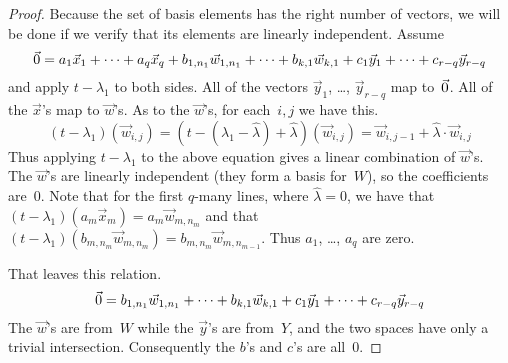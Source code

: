\begin{proof}
Because the set of basis elements 
has the right number of vectors, we will be done if we verify that
its elements are linearly independent.
Assume
\begin{equation*}
  \vec{0}
  =a_1\vec{x}_1+\cdots+a_q\vec{x}_q
    +b_{1,n_1}\vec{w}_{1,n_1}+\cdots+b_{k,1}\vec{w}_{k,1}
    +c_1\vec{y}_1+\cdots+c_{r-q}\vec{y}_{r-q}
\end{equation*}
and apply $t-\lambda_1$ to both sides.
All of the vectors $\vec{y}_1$, \ldots, $\vec{y}_{r-q}$ map to~$\vec{0}$.
All of the $\vec{x}$'s map to $\vec{w}$'s.
As to the $\vec{w}$'s, for each~$i,j$ we have this.
\begin{equation*}
  (t-\lambda_1)(\vec{w}_{i,j})
    =(t-(\lambda_1-\hat{\lambda})+\hat{\lambda})(\vec{w}_{i,j})
    =\vec{w}_{i,j-1}+\hat{\lambda}\cdot\vec{w}_{i,j} 
\end{equation*}
Thus applying $t-\lambda_1$ to the above equation gives a linear combination
of $\vec{w}$'s.
The $\vec{w}$'s are linearly independent (they form a basis for~$W$),
so the coefficients are~$0$.
Note that for the first $q$-many lines, where $\hat{\lambda}=0$,
we have that $(t-\lambda_1)(a_m\vec{x}_m)=a_m\vec{w}_{m,n_m}$ and  
that 
$(t-\lambda_1)(b_{m,n_m}\vec{w}_{m,n_m})=b_{m,n_m}\vec{w}_{m,n_{m-1}}$. 
Thus $a_1$, \ldots, $a_q$ are zero. 

That leaves this relation.
\begin{equation*}
  \vec{0}
  =
    b_{1,n_1}\vec{w}_{1,n_1}+\cdots+b_{k,1}\vec{w}_{k,1}
    +c_1\vec{y}_1+\cdots+c_{r-q}\vec{y}_{r-q}
\end{equation*}
The $\vec{w}$'s are from~$W$ while the $\vec{y}$'s are from~$Y$, and the
two spaces have only a trivial intersection.
Consequently the $b$'s and $c$'s are all~$0$.
\end{proof}





